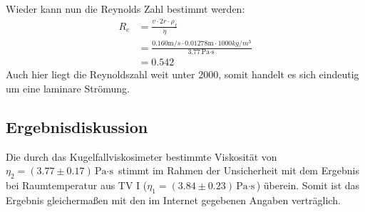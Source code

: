 \documentclass{report}
\begin{document}
Wieder kann nun die Reynolds Zahl bestimmt werden:
\begin{equation}
    \begin{split}
        R_e &= \frac{v \cdot 2r \cdot \rho_f}{\eta} \\
            &= \frac{0.160\si{\m/s} \cdot 0.01278\si{\m} \cdot 1000\si{kg/m^3}}{3.77 \si{\Pa \cdot \s}} \\
            &= 0.542
    \end{split}
\end{equation}
Auch hier liegt die Reynoldszahl weit unter 2000, somit handelt es sich eindeutig um eine laminare Strömung.
\subsection{Ergebnisdiskussion}
Die durch das Kugelfallviskosimeter bestimmte Viskosität von $\eta_2 = (3.77 \pm 0.17)\si{\Pa \cdot \s}$ stimmt im Rahmen der Unsicherheit mit dem Ergebnis bei Raumtemperatur aus 
TV I ($\eta_1 = (3.84 \pm 0.23) \si{\Pa \cdot \s}$) überein. Somit ist das Ergebnis gleichermaßen mit den im Internet gegebenen Angaben verträglich.



\end{document}

